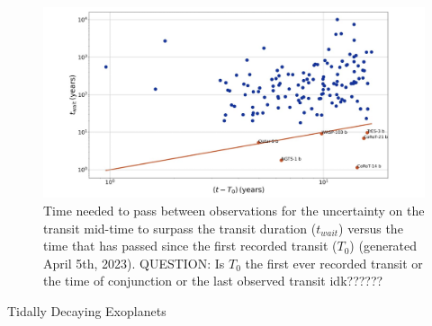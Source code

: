 \documentclass[oneside,12pt]{amsart}
\numberwithin{page}{section}
\begin{document}
\begin{figure}[htbp]
    \centering 
    \includegraphics[width=\linewidth]{figs/jackson_fig3.png}
    \caption{Time needed to pass between observations for the uncertainty on the transit mid-time to surpass the transit duration ($t_{wait}$) versus the time that has passed since the first recorded transit ($T_0$) (generated April 5th, 2023). QUESTION: Is $T_0$ the first ever recorded transit or the time of conjunction or the last observed transit idk??????}
    \label{fig:jackson_fig3}
\end{figure}

Tidally Decaying Exoplanets
\end{document}
